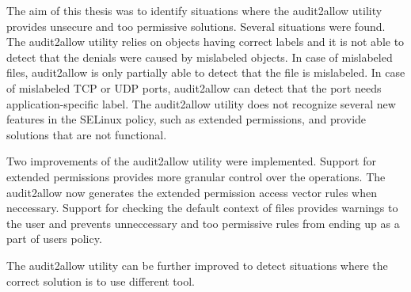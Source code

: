 The aim of this thesis was to identify situations where the audit2allow utility
provides unsecure and too permissive solutions. Several situations were found.
The audit2allow utility relies on objects having correct labels and it is not
able to detect that the denials were caused by mislabeled objects. In case of
mislabeled files, audit2allow is only partially able to detect that the file is
mislabeled. In case of mislabeled TCP or UDP ports, audit2allow can detect that
the port needs application-specific label. The audit2allow utility does not
recognize several new features in the SELinux policy, such as extended
permissions, and provide solutions that are not functional.

Two improvements of the audit2allow utility were implemented. Support for
extended permissions provides more granular control over the operations. The
audit2allow now generates the extended permission access vector rules when
neccessary. Support for checking the default context of files provides warnings
to the user and prevents unneccessary and too permissive rules from ending up as
a part of users policy.

The audit2allow utility can be further improved to detect situations where the
correct solution is to use different tool.
